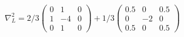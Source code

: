 \documentclass[12pt]{standalone}
\begin{document}
$\displaystyle 
\nabla^2_{L}=2/3
\begin{pmatrix}
  0 & 1 & 0 \\
  1 & -4 & 0 \\
  0 & 1 & 0
\end{pmatrix}
+1/3
\begin{pmatrix}
  0.5 & 0 & 0.5 \\
  0 & -2 & 0 \\
  0.5 & 0 & 0.5
\end{pmatrix}
$
\end{document}
